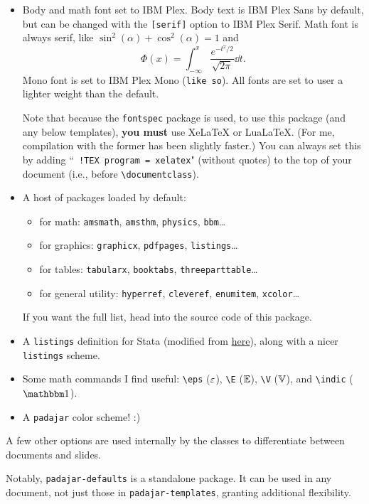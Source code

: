 \documentclass[11pt]{padajar-memo}
\newcommand{\ttslash}[1]{\texttt{\textbackslash #1}}
\begin{document}
\begin{itemize}
	\item Body and math font set to IBM Plex. Body text is IBM Plex Sans by default, but can be changed with the \texttt{[serif]} option to IBM Plex Serif. Math font is always serif, like $\sin^2(\alpha) + \cos^2(\alpha) = 1$ and
	\[
	\Phi(x) = \int_{-\infty}^x \frac{e^{-t^2/2}}{\sqrt{2\pi}} \dd{t}.
	\]
	Mono font is set to IBM Plex Mono (\texttt{like so}). All fonts are set to user a lighter weight than the default.

	Note that because the \texttt{fontspec} package is used, to use this package (and any below templates), \textbf{you must} use XeLaTeX or LuaLaTeX. (For me, compilation with the former has been slightly faster.) You can always set this by adding ``\texttt{ !TEX program = xelatex}" (without quotes) to the top of your document (i.e., before \ttslash{documentclass}).
	\item A host of packages loaded by default:
	\begin{itemize}
		\item for math: \texttt{amsmath}, \texttt{amsthm}, \texttt{physics}, \texttt{bbm}\dots
		\item for graphics: \texttt{graphicx}, \texttt{pdfpages}, \texttt{listings}\dots
		\item for tables: \texttt{tabularx}, \texttt{booktabs}, \texttt{threeparttable}\dots
		\item for general utility: \texttt{hyperref}, \texttt{cleveref}, \texttt{enumitem}, \texttt{xcolor}\dots
	\end{itemize}
	If you want the full list, head into the source code of this package.
	\item A \texttt{listings} definition for Stata (modified from \href{https://github.com/satejsoman/stata-lstlisting}{here}), along with a nicer \texttt{listings} scheme.
	\item Some math commands I find useful: \ttslash{eps} ($\varepsilon$), \ttslash{E} ($\mathbb{E}$), \ttslash{V} ($\mathbb{V}$), and \ttslash{indic} ($\indic$).
	\item A \texttt{padajar} color scheme! :)
\end{itemize}

A few other options are used internally by the classes to differentiate between documents and slides.

Notably, \texttt{padajar-defaults} is a standalone package. It can be used in any document, not just those in \texttt{padajar-templates}, granting additional flexibility.
\end{document}
